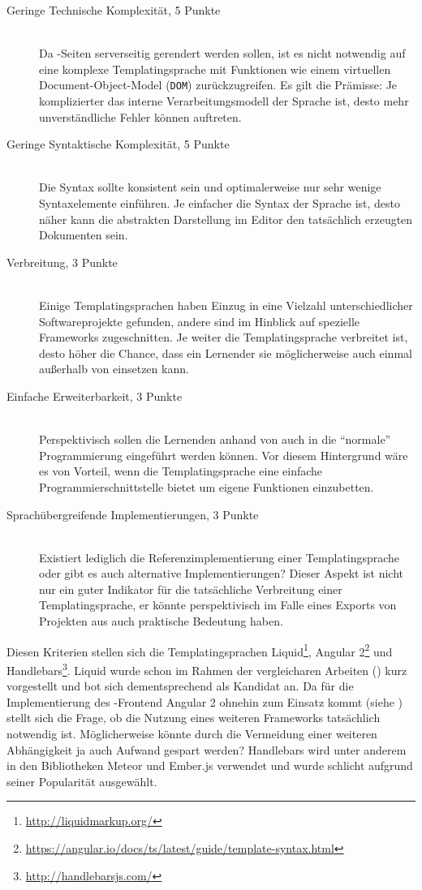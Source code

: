 \begin{description}
\item[Geringe Technische Komplexität, 5 Punkte] \hfill \\
  Da \idename{}-Seiten serverseitig gerendert werden sollen, ist es nicht notwendig auf eine komplexe Templatingsprache mit Funktionen wie einem virtuellen Document-Object-Model (\texttt{DOM}) zurückzugreifen. Es gilt die Prämisse: Je komplizierter das interne Verarbeitungsmodell der Sprache ist, desto mehr unverständliche Fehler können auftreten.
\item[Geringe Syntaktische Komplexität, 5 Punkte] \hfill \\
  Die Syntax sollte konsistent sein und optimalerweise nur sehr wenige Syntaxelemente einführen. Je einfacher die Syntax der Sprache ist, desto näher kann die abstrakten Darstellung im Editor den tatsächlich erzeugten Dokumenten sein.
\item[Verbreitung, 3 Punkte] \hfill \\
  Einige Templatingsprachen haben Einzug in eine Vielzahl unterschiedlicher Softwareprojekte gefunden, andere sind im Hinblick auf spezielle Frameworks zugeschnitten. Je weiter die Templatingsprache verbreitet ist, desto höher die Chance, dass ein Lernender sie möglicherweise auch einmal außerhalb von \idename{} einsetzen kann.
\item[Einfache Erweiterbarkeit, 3 Punkte] \hfill \\
  Perspektivisch sollen die Lernenden anhand von \idename{} auch in die "`normale"' Programmierung eingeführt werden können. Vor diesem Hintergrund wäre es von Vorteil, wenn die Templatingsprache eine einfache Programmierschnittstelle bietet um eigene Funktionen einzubetten.
\item[Sprachübergreifende Implementierungen, 3 Punkte] \hfill \\
  Existiert lediglich die Referenzimplementierung einer Templatingsprache oder gibt es auch alternative Implementierungen? Dieser Aspekt ist nicht nur ein guter Indikator für die tatsächliche Verbreitung einer Templatingsprache, er könnte perspektivisch im Falle eines Exports von Projekten aus \idename{} auch praktische Bedeutung haben.
\end{description}

Diesen Kriterien stellen sich die Templatingsprachen Liquid\footnote{\url{http://liquidmarkup.org/}}, Angular 2\footnote{\url{https://angular.io/docs/ts/latest/guide/template-syntax.html}} und Handlebars\footnote{\url{http://handlebarsjs.com/}}. Liquid wurde schon im Rahmen der vergleicharen Arbeiten () kurz vorgestellt und bot sich dementsprechend als Kandidat an. Da für die Implementierung des \idename{}-Frontend Angular 2 ohnehin zum Einsatz kommt (siehe ) stellt sich die Frage, ob die Nutzung eines weiteren Frameworks tatsächlich notwendig ist. Möglicherweise könnte durch die Vermeidung einer weiteren Abhängigkeit ja auch Aufwand gespart werden? Handlebars wird unter anderem in den Bibliotheken Meteor und Ember.js verwendet und wurde schlicht aufgrund seiner Popularität ausgewählt.

